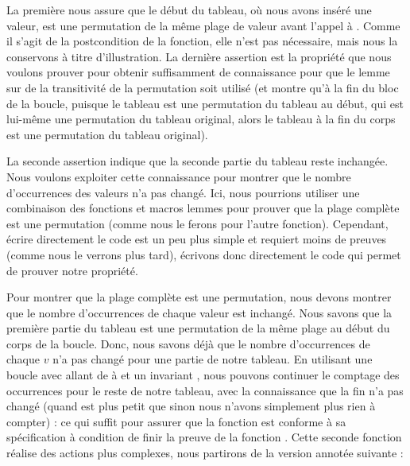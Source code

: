 La première nous assure que le début du tableau, où nous avons inséré une valeur,
est une permutation de la même plage de valeur avant l'appel à .
Comme il s'agit de la postcondition de la fonction, elle n'est pas nécessaire, mais nous
la conservons à titre d'illustration. La dernière assertion est la propriété que
nous voulons prouver pour obtenir suffisamment de connaissance pour que le
lemme sur de la transitivité de la permutation soit utilisé (et montre qu'à
la fin du bloc de la boucle, puisque le tableau est une permutation du tableau
au début, qui est lui-même une permutation du tableau original, alors le tableau
à la fin du corps est une permutation du tableau original).


La seconde assertion indique que la seconde partie du tableau reste inchangée.
Nous voulons exploiter cette connaissance pour montrer que le nombre d'occurrences des
valeurs n'a pas changé. Ici, nous pourrions utiliser une combinaison des
fonctions et macros lemmes pour prouver que la plage complète est une
permutation (comme nous le ferons pour l'autre fonction). Cependant, écrire
directement le code est un peu plus simple et requiert moins de preuves (comme
nous le verrons plus tard), écrivons donc directement le code qui permet de
prouver notre propriété.


Pour montrer que la plage complète est une permutation, nous devons montrer que le
nombre d'occurrences de chaque valeur est inchangé. Nous savons que la première
partie du tableau est une permutation de la même plage au début du corps de la
boucle. Donc, nous savons déjà que le nombre d'occurrences de chaque $v$ n'a pas
changé pour une partie de notre tableau. En utilisant une boucle avec
 allant de  à  et un invariant
, nous pouvons continuer le comptage des
occurrences pour le reste de notre tableau, avec la connaissance que la fin n'a
pas changé (quand  est plus petit que  sinon
nous n'avons simplement plus rien à compter) :
ce qui suffit pour assurer que la fonction 
est conforme à sa spécification à condition de finir la preuve de la fonction
. Cette seconde fonction réalise des actions plus
complexes, nous partirons de la version annotée suivante :




